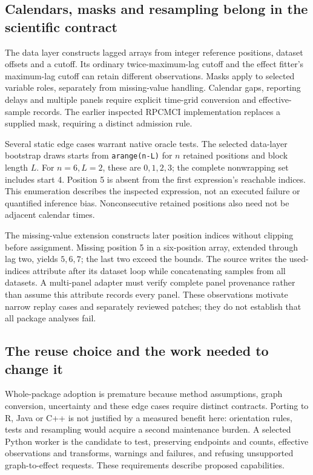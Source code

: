 \subsection{Calendars, masks and resampling belong in the scientific contract}
\label{exec23:tigramite-calendar}
The data layer constructs lagged arrays from integer reference positions, dataset offsets and a cutoff. Its ordinary twice-maximum-lag cutoff and the effect fitter's maximum-lag cutoff can retain different observations. Masks apply to selected variable roles, separately from missing-value handling. Calendar gaps, reporting delays and multiple panels require explicit time-grid conversion and effective-sample records. The earlier inspected RPCMCI implementation replaces a supplied mask, requiring a distinct admission rule. \cite{exec23_tigramite_reuse_source}

Several static edge cases warrant native oracle tests. The selected data-layer bootstrap draws starts from \texttt{arange(n-L)} for $n$ retained positions and block length $L$. For $n=6,L=2$, these are $0,1,2,3$; the complete nonwrapping set includes start 4. Position 5 is absent from the first expression's reachable indices. This enumeration describes the inspected expression, not an executed failure or quantified inference bias. Nonconsecutive retained positions also need not be adjacent calendar times. \cite{exec23_tigramite_reuse_source,exec23_tigramite_reference}

The missing-value extension constructs later position indices without clipping before assignment. Missing position 5 in a six-position array, extended through lag two, yields $5,6,7$; the last two exceed the bounds. The source writes the used-indices attribute after its dataset loop while concatenating samples from all datasets. A multi-panel adapter must verify complete panel provenance rather than assume this attribute records every panel. These observations motivate narrow replay cases and separately reviewed patches; they do not establish that all package analyses fail. \cite{exec23_tigramite_reuse_source,exec23_tigramite_reference}

\subsection{The reuse choice and the work needed to change it}
\label{exec23:tigramite-choice}
Whole-package adoption is premature because method assumptions, graph conversion, uncertainty and these edge cases require distinct contracts. Porting to R, Java or C++ is not justified by a measured benefit here: orientation rules, tests and resampling would acquire a second maintenance burden. A selected Python worker is the candidate to test, preserving endpoints and counts, effective observations and transforms, warnings and failures, and refusing unsupported graph-to-effect requests. These requirements describe proposed capabilities.

